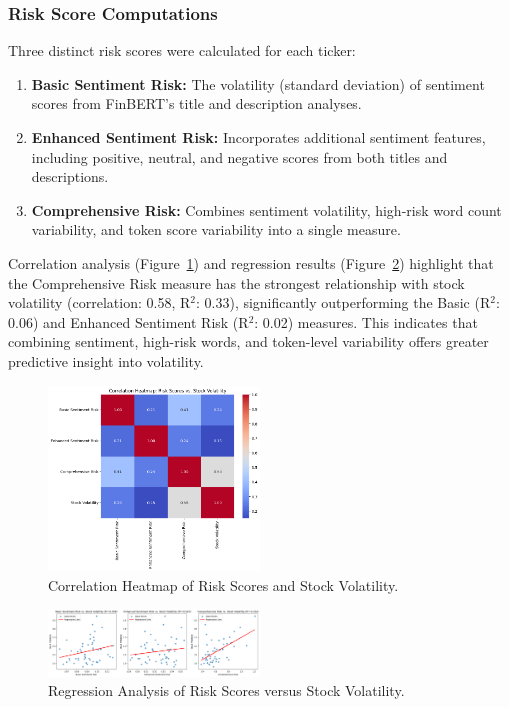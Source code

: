 \documentclass[twocolumn]{article}
\begin{document}
\subsubsection{Risk Score Computations}

Three distinct risk scores were calculated for each ticker:

\begin{enumerate}
    \item \textbf{Basic Sentiment Risk:} The volatility (standard deviation) of sentiment scores from FinBERT's title and description analyses.
    \item \textbf{Enhanced Sentiment Risk:} Incorporates additional sentiment features, including positive, neutral, and negative scores from both titles and descriptions.
    \item \textbf{Comprehensive Risk:} Combines sentiment volatility, high-risk word count variability, and token score variability into a single measure.
\end{enumerate}

Correlation analysis (Figure~\ref{fig:risk_corr_heatmap}) and regression results (Figure~\ref{fig:risk_regressions}) highlight that the Comprehensive Risk measure has the strongest relationship with stock volatility (correlation: 0.58, R$^2$: 0.33), significantly outperforming the Basic (R$^2$: 0.06) and Enhanced Sentiment Risk (R$^2$: 0.02) measures. This indicates that combining sentiment, high-risk words, and token-level variability offers greater predictive insight into volatility.

\begin{figure}[ht]
    \centering
    \includegraphics[width=0.5\textwidth]{correlation_heatmap_risks.png}
    \caption{Correlation Heatmap of Risk Scores and Stock Volatility.}
    \label{fig:risk_corr_heatmap}
\end{figure}

\begin{figure}[ht]
    \centering
    \includegraphics[width=0.5\textwidth]{regression_risk_volatility.png}
    \caption{Regression Analysis of Risk Scores versus Stock Volatility.}
    \label{fig:risk_regressions}
\end{figure}
\end{document}
